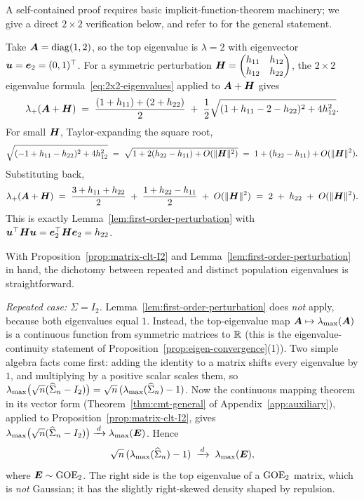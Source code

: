 A self-contained proof requires basic implicit-function-theorem machinery; we give a direct \(2 \times 2\) verification below, and refer to \citet[][Lem.~B.10]{AbryBoniecedidierWendt2024} for the general statement.

\begin{example}\label{ex:perturbation-2x2}
Take \(\bm{A} = \operatorname{diag}(1, 2)\), so the top eigenvalue is \(\lambda = 2\) with eigenvector \(\bm{u} = \bm{e}_2 = (0, 1)^{\top}\). For a symmetric perturbation \(\bm{H} = \begin{pmatrix} h_{11} & h_{12} \\ h_{12} & h_{22} \end{pmatrix}\), the \(2 \times 2\) eigenvalue formula~\eqref{eq:2x2-eigenvalues} applied to \(\bm{A} + \bm{H}\) gives
\[
  \lambda_+(\bm{A} + \bm{H}) \;=\; \frac{(1 + h_{11}) + (2 + h_{22})}{2} \;+\; \frac{1}{2}\sqrt{(1 + h_{11} - 2 - h_{22})^2 + 4 h_{12}^2}.
\]
For small \(\bm{H}\), Taylor-expanding the square root,
\[
  \sqrt{(-1 + h_{11} - h_{22})^2 + 4 h_{12}^2} \;=\; \sqrt{1 + 2(h_{22} - h_{11}) + O(\lVert\bm{H}\rVert^2)} \;=\; 1 + (h_{22} - h_{11}) + O(\lVert\bm{H}\rVert^2).
\]
Substituting back,
\[
  \lambda_+(\bm{A} + \bm{H}) \;=\; \frac{3 + h_{11} + h_{22}}{2} \;+\; \frac{1 + h_{22} - h_{11}}{2} \;+\; O(\lVert\bm{H}\rVert^2) \;=\; 2 \;+\; h_{22} \;+\; O(\lVert\bm{H}\rVert^2).
\]
This is exactly Lemma~\ref{lem:first-order-perturbation} with \(\bm{u}^{\top} \bm{H} \bm{u} = \bm{e}_2^{\top} \bm{H} \bm{e}_2 = h_{22}\).
\end{example}

With Proposition~\ref{prop:matrix-clt-I2} and Lemma~\ref{lem:first-order-perturbation} in hand, the dichotomy between repeated and distinct population eigenvalues is straightforward.

\smallskip
\noindent\emph{Repeated case: \(\Sigma = I_2\).} Lemma~\ref{lem:first-order-perturbation} does \emph{not} apply, because both eigenvalues equal \(1\). Instead, the top-eigenvalue map \(\bm{A} \mapsto \lambda_{\max}(\bm{A})\) is a continuous function from symmetric matrices to \(\mathbb{R}\) (this is the eigenvalue-continuity statement of Proposition~\ref{prop:eigen-convergence}(1)). Two simple algebra facts come first: adding the identity to a matrix shifts every eigenvalue by \(1\), and multiplying by a positive scalar scales them, so \(\lambda_{\max}\bigl(\sqrt{n}(\widehat{\Sigma}_n - I_2)\bigr) = \sqrt{n}\,(\lambda_{\max}(\widehat{\Sigma}_n) - 1)\). Now the continuous mapping theorem in its vector form (Theorem~\ref{thm:cmt-general} of Appendix~\ref{app:auxiliary}), applied to Proposition~\ref{prop:matrix-clt-I2}, gives \(\lambda_{\max}\bigl(\sqrt{n}(\widehat{\Sigma}_n - I_2)\bigr) \xrightarrow{\,d\,} \lambda_{\max}(\bm{E})\). Hence
\[
  \sqrt{n}\,(\lambda_{\max}(\widehat{\Sigma}_n) - 1) \;\xrightarrow{\,d\,}\; \lambda_{\max}(\bm{E}),
\]
where \(\bm{E} \sim \mathrm{GOE}_2\). The right side is the top eigenvalue of a \(\mathrm{GOE}_2\) matrix, which is \emph{not} Gaussian; it has the slightly right-skewed density shaped by repulsion.


